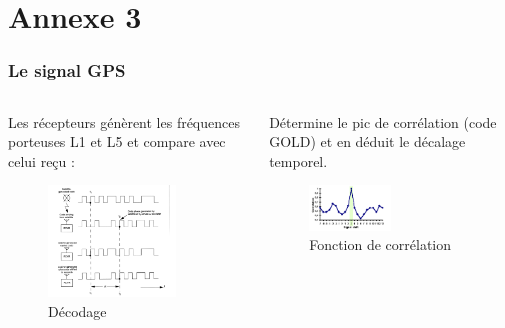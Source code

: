 \documentclass[xcolor=dvipsnames,envcountsect]{beamer}
\begin{document}
\section{Annexe 3}
\begin{frame}
	\label{appendix:3}
	\frametitle{Le signal GPS}
	\begin{columns}
		\begin{column}{0.5\textwidth}
			Les récepteurs génèrent les fréquences porteuses L1 et L5 et compare avec celui reçu :
			\begin{figure}
				\centering
				\includegraphics[width=0.8\textwidth]{./Figures/correl1.png}
				\caption {Décodage \cite{ens}}
			\end{figure}
		\end{column}
		\begin{column}{0.5\textwidth}
			{\tiny Détermine le pic de corrélation (code GOLD) et en déduit le décalage temporel.}
			\begin{figure}
				\centering
				\includegraphics[width=0.5\textwidth]{./Figures/correl2.png}
				\caption {Fonction de corrélation \cite{ens}}
			\end{figure}


\end{column}
\end{columns}
\end{frame}
\end{document}
